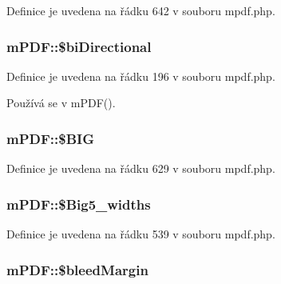 Definice je uvedena na řádku 642 v souboru mpdf.\-php.

\hypertarget{classm_p_d_f_a284238da0bc140f84b5b72acad0e0897}{
\subsubsection[{\$bi\-Directional}]{\setlength{\rightskip}{0pt plus 5cm}m\-P\-D\-F\-::\$bi\-Directional}}\label{classm_p_d_f_a284238da0bc140f84b5b72acad0e0897}


Definice je uvedena na řádku 196 v souboru mpdf.\-php.



Používá se v m\-P\-D\-F().

\hypertarget{classm_p_d_f_aeb039c11cd29b20354c980a34f46f2a4}{
\subsubsection[{\$\-B\-I\-G}]{\setlength{\rightskip}{0pt plus 5cm}m\-P\-D\-F\-::\$\-B\-I\-G}}\label{classm_p_d_f_aeb039c11cd29b20354c980a34f46f2a4}


Definice je uvedena na řádku 629 v souboru mpdf.\-php.

\hypertarget{classm_p_d_f_a7f463e5f5af32782f00ecd32ff1be745}{
\subsubsection[{\$\-Big5\-\_\-widths}]{\setlength{\rightskip}{0pt plus 5cm}m\-P\-D\-F\-::\$\-Big5\-\_\-widths}}\label{classm_p_d_f_a7f463e5f5af32782f00ecd32ff1be745}


Definice je uvedena na řádku 539 v souboru mpdf.\-php.

\hypertarget{classm_p_d_f_a22b445f6e0e579ba7237b12ffcc71a74}{
\subsubsection[{\$bleed\-Margin}]{\setlength{\rightskip}{0pt plus 5cm}m\-P\-D\-F\-::\$bleed\-Margin}}\label{classm_p_d_f_a22b445f6e0e579ba7237b12ffcc71a74}


